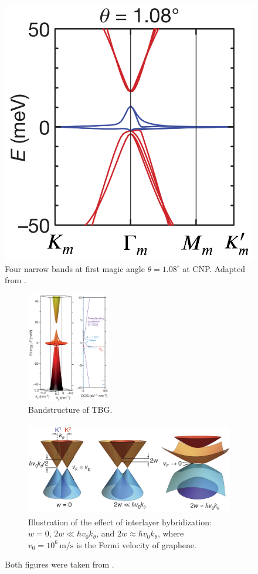 \begin{figure}[H]
\centering
\includegraphics[width=0.4\linewidth]{fig/tbg_4_narrowbands.png}
\caption{Four narrow bands at first magic angle $\theta = 1.08^\circ$ at CNP. Adapted from \cite{cao2018_correlated}.}
\label{fig:tbg_4_narrowbands}
\end{figure}


\begin{figure}[H]
\centering
\begin{subfigure}{.30\textwidth}
  \centering
  \includegraphics[height=13em]{fig/tbg_bandstructure.png}
  \caption{Bandstructure of TBG.}
  \label{fig:tbg_device}
\end{subfigure} \hfill
\begin{subfigure}{.68\textwidth}
  \centering
  \includegraphics[height=11em]{fig/tbg_dirac_cones.png}
  \caption{Illustration of the effect of interlayer hybridization: \( w = 0 \), \( 2w \ll \hbar v_0 k_\theta \), and \( 2w \approx \hbar v_0 k_\theta \), where \( v_0 = 10^6 \, \text{m/s} \) is the Fermi velocity of graphene.}
  \label{fig:tbg_dirac_cones}
\end{subfigure}
\caption{Both figures were taken from \cite{cao2018_correlated}.}
\label{fig:tbg_figures_taken_from_correlated_insul}
\end{figure}


